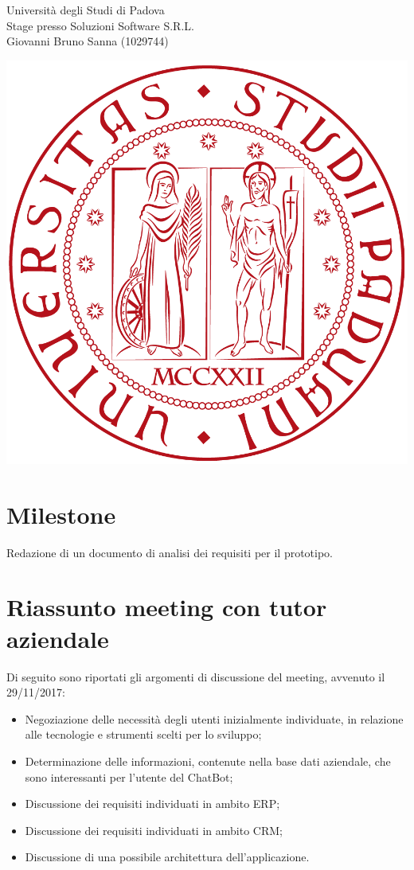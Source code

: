\documentclass[11pt,notitlepage]{article}
\newcommand{\nomeStudente}{Giovanni Bruno}
\newcommand{\cognomeStudente}{Sanna}
\newcommand{\matricolaStudente}{1029744}
\newcommand{\ragioneSocAzienda}{Soluzioni Software S.R.L.}
\begin{document}
\noindent
\parbox{0.7\columnwidth}{Università degli Studi di Padova\\
	Stage presso \ragioneSocAzienda{}\\
	\nomeStudente{} \cognomeStudente{} (\matricolaStudente{})}%
\parbox{0.3\columnwidth}{
	\hfill \includegraphics[scale=0.08]{immagini/logo-unipd.png}}

\bigskip
\section*{Milestone}
Redazione di un documento di analisi dei requisiti per il prototipo.

\bigskip
\section*{Riassunto meeting con tutor aziendale}
Di seguito sono riportati gli argomenti di discussione del meeting, avvenuto il 29/11/2017:
\begin{itemize}
		\item Negoziazione delle necessità degli utenti inizialmente individuate, in relazione alle tecnologie e strumenti scelti per lo sviluppo;
		\item Determinazione delle informazioni, contenute nella base dati aziendale, che sono interessanti per l'utente del ChatBot;
		\item Discussione dei requisiti individuati in ambito ERP;
		\item Discussione dei requisiti individuati in ambito CRM;
		\item Discussione di una possibile architettura dell'applicazione.
\end{itemize} 
\end{document}
